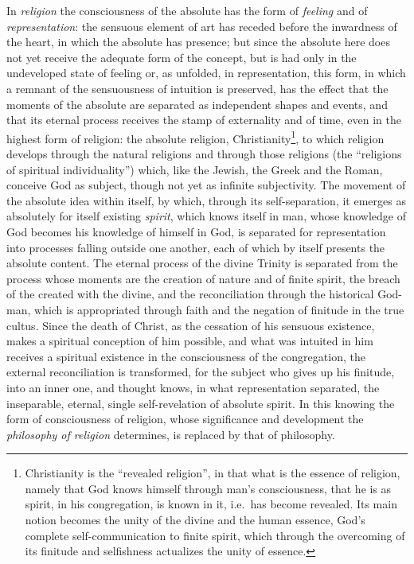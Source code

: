 In \emph{religion} the consciousness of the absolute has the form of
\emph{feeling} and of \emph{representation}: the sensuous element of art
has receded before the inwardness of the heart, in which the absolute
has presence; but since the absolute here does not yet receive the
adequate form of the concept, but is had only in the undeveloped state of
feeling or, as unfolded, in representation, this form, in which a
remnant of the sensuousness of intuition is preserved, has the effect
that the moments of the absolute are separated as independent shapes and
events, and that its eternal process receives the stamp of externality
and of time, even in the highest form of religion: the absolute
religion, Christianity\footnote{Christianity is the ``revealed
religion'', in that what is the essence of religion, namely that God
knows himself through man's consciousness, that he is as spirit, in his
congregation, is known in it, i.e.\ has become revealed. Its main notion
becomes the unity of the divine and the human essence, God's complete
self-communication to finite spirit, which through the overcoming of its
finitude and selfishness actualizes the unity of essence.}, to which
religion develops through the natural religions and through those
religions (the ``religions of spiritual individuality'') which, like the
Jewish, the Greek and the Roman, conceive God as subject, though not yet
as infinite subjectivity. The movement of the absolute idea within
itself, by which, through its self-separation, it emerges as absolutely
for itself existing \emph{spirit}, which knows itself in man, whose
knowledge of God becomes his knowledge of himself in God, is
separated for representation into processes falling outside one
another, each of which by itself presents the absolute content. The
eternal process of the divine Trinity is separated from the process
whose moments are the creation of nature and of finite spirit, the
breach of the created with the divine, and the reconciliation through
the historical God-man, which is appropriated through faith and the
negation of finitude in the true cultus. Since the death of Christ, as
the cessation of his sensuous existence, makes a spiritual conception of
him possible, and what was intuited in him receives a spiritual
existence in the consciousness of the congregation, the external
reconciliation is transformed, for the subject who gives up his
finitude, into an inner one, and thought knows, in what representation
separated, the inseparable, eternal, single self-revelation of absolute
spirit. In this knowing the form of consciousness of religion, whose
significance and development the \emph{philosophy of religion}
determines, is replaced by that of philosophy.


